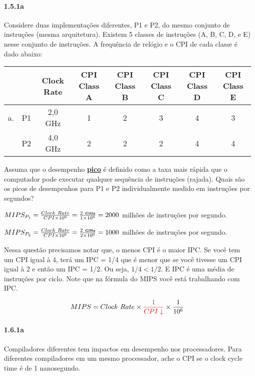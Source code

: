 \documentclass{article}
\begin{document}
\paragraph{1.5.1a} Considere duas implementações diferentes, P1 e P2, do mesmo 
conjunto de instruções (mesma arquitetura). Existem 5 classes de instruções (A, 
B, C, D, e E) nesse conjunto de instruções. A frequência de relógio e o CPI de 
cada classe é dado abaixo:

\begin{tabular}{|c|c|c|c|c|c|c|c|}
  \hline  &
          & Clock Rate
          & CPI Class A
          & CPI Class B
          & CPI Class C
          & CPI Class D
          & CPI Class E \\
  \hline    a.
          & P1
          & 2,0 GHz
          & 1
          & 2
          & 3
          & 4
          & 3 \\
  \hline  & P2
          & 4,0 GHz
          & 2
          & 2
          & 2
          & 4
          & 4 \\
  \hline
\end{tabular}

Assuma que o desempenho \underline{\textbf{pico}} é definido como a taxa mais 
rápida que o computador pode executar qualquer sequência de instruções 
(rajada). Quais são os picos de desempenhos para P1 e P2 individualmente medido 
em instruções por segundos?

$MIPS_{P_{1}} = \frac{Clock\ Rate}{CPI \times 10^{6}} = \frac{2\ \textbf{\tiny 
GHz}}{1 \times 10^{6}} = 2000$ milhões de instruções por segundo.

$MIPS_{P_{2}} = \frac{Clock\ Rate}{CPI \times 10^{6}} = \frac{2\ \textbf{\tiny 
GHz}}{2 \times 10^{6}} = 1000$ milhões de instruções por segundo.

Nessa questão precisamos notar que, o menos CPI é o maior IPC. Se você tem um 
CPI igual à 4, terá um IPC = 1/4 que é menor que se você tivesse um CPI igual à 
2 e então um IPC = 1/2. Ou seja, $1/4 < 1/2$. E IPC é uma média de instruções 
por ciclo. Note que na fórmula do MIPS você está trabalhando com IPC.

$$MIPS = Clock\ Rate \times {\color{red} \frac{1}{CPI \downarrow}} \times 
\frac{1}{10^{6}}$$

\clearpage
\paragraph{1.6.1a} Compiladores diferentes tem impactos em desempenho nos
processadores. Para diferentes compiladores em um mesmo processador, ache o CPI 
se o clock cycle time é de 1 nanosegundo.
\end{document}
